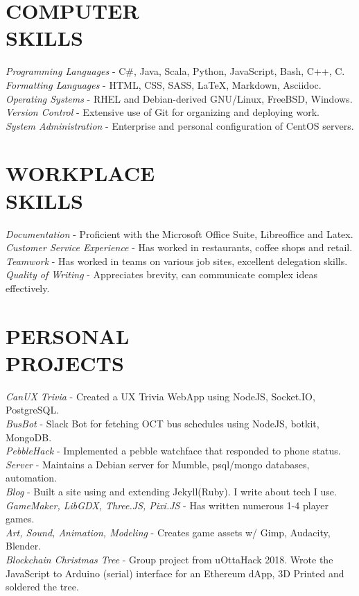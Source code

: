 \documentclass[margin]{res}
\begin{document}
\begin{resume}
\section{COMPUTER \\ SKILLS} 
{\sl Programming Languages} - C\#, Java, Scala, Python, JavaScript, Bash, C++, C.\\
{\sl Formatting Languages} - HTML, CSS, SASS, LaTeX, Markdown, Asciidoc.\\
{\sl Operating Systems} - RHEL and Debian-derived GNU/Linux, FreeBSD, Windows. \\
{\sl Version Control} - Extensive use of Git for organizing and deploying work. \\
{\sl System Administration } - Enterprise and personal configuration of CentOS servers.
                 
\section{WORKPLACE \\ SKILLS} 
 {\sl Documentation} - Proficient with the Microsoft Office Suite, Libreoffice and Latex.\\
{\sl Customer Service Experience} - Has worked in restaurants, coffee shops and retail.\\
{\sl Teamwork} - Has worked in teams on various job sites, excellent delegation skills.\\
{\sl Quality of Writing} - Appreciates brevity, can communicate complex ideas effectively.\\

\section{PERSONAL \\ PROJECTS}
{\sl CanUX Trivia} - Created a UX Trivia WebApp using NodeJS, Socket.IO, PostgreSQL.\\
{\sl BusBot} - Slack Bot for fetching OCT bus schedules using NodeJS, botkit, MongoDB.\\
{\sl PebbleHack} - Implemented a pebble watchface that responded to phone status.\\
{\sl Server} - Maintains a Debian server for Mumble, psql/mongo databases, automation.\\   
{\sl Blog} - Built a site using and extending Jekyll(Ruby). I write about tech I use.\\  
{\sl GameMaker, LibGDX, Three.JS, Pixi.JS} - Has written numerous 1-4 player games.\\
{\sl Art, Sound, Animation, Modeling} - Creates game assets w/ Gimp, Audacity, Blender.\\
{\sl Blockchain Christmas Tree} - Group project from uOttaHack 2018. Wrote the JavaScript to Arduino (serial) interface for an Ethereum dApp, 3D Printed and soldered the tree.\\

\end{resume}
\end{document}
